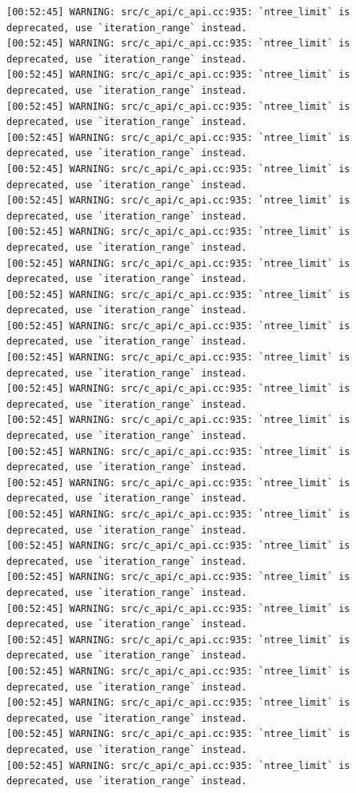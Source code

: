 \documentclass[
  letterpaper,
  DIV=11,
  numbers=noendperiod]{scrartcl}
\begin{document}
\begin{verbatim}
[00:52:45] WARNING: src/c_api/c_api.cc:935: `ntree_limit` is deprecated, use `iteration_range` instead.
[00:52:45] WARNING: src/c_api/c_api.cc:935: `ntree_limit` is deprecated, use `iteration_range` instead.
[00:52:45] WARNING: src/c_api/c_api.cc:935: `ntree_limit` is deprecated, use `iteration_range` instead.
[00:52:45] WARNING: src/c_api/c_api.cc:935: `ntree_limit` is deprecated, use `iteration_range` instead.
[00:52:45] WARNING: src/c_api/c_api.cc:935: `ntree_limit` is deprecated, use `iteration_range` instead.
[00:52:45] WARNING: src/c_api/c_api.cc:935: `ntree_limit` is deprecated, use `iteration_range` instead.
[00:52:45] WARNING: src/c_api/c_api.cc:935: `ntree_limit` is deprecated, use `iteration_range` instead.
[00:52:45] WARNING: src/c_api/c_api.cc:935: `ntree_limit` is deprecated, use `iteration_range` instead.
[00:52:45] WARNING: src/c_api/c_api.cc:935: `ntree_limit` is deprecated, use `iteration_range` instead.
[00:52:45] WARNING: src/c_api/c_api.cc:935: `ntree_limit` is deprecated, use `iteration_range` instead.
[00:52:45] WARNING: src/c_api/c_api.cc:935: `ntree_limit` is deprecated, use `iteration_range` instead.
[00:52:45] WARNING: src/c_api/c_api.cc:935: `ntree_limit` is deprecated, use `iteration_range` instead.
[00:52:45] WARNING: src/c_api/c_api.cc:935: `ntree_limit` is deprecated, use `iteration_range` instead.
[00:52:45] WARNING: src/c_api/c_api.cc:935: `ntree_limit` is deprecated, use `iteration_range` instead.
[00:52:45] WARNING: src/c_api/c_api.cc:935: `ntree_limit` is deprecated, use `iteration_range` instead.
[00:52:45] WARNING: src/c_api/c_api.cc:935: `ntree_limit` is deprecated, use `iteration_range` instead.
[00:52:45] WARNING: src/c_api/c_api.cc:935: `ntree_limit` is deprecated, use `iteration_range` instead.
[00:52:45] WARNING: src/c_api/c_api.cc:935: `ntree_limit` is deprecated, use `iteration_range` instead.
[00:52:45] WARNING: src/c_api/c_api.cc:935: `ntree_limit` is deprecated, use `iteration_range` instead.
[00:52:45] WARNING: src/c_api/c_api.cc:935: `ntree_limit` is deprecated, use `iteration_range` instead.
[00:52:45] WARNING: src/c_api/c_api.cc:935: `ntree_limit` is deprecated, use `iteration_range` instead.
[00:52:45] WARNING: src/c_api/c_api.cc:935: `ntree_limit` is deprecated, use `iteration_range` instead.
[00:52:45] WARNING: src/c_api/c_api.cc:935: `ntree_limit` is deprecated, use `iteration_range` instead.
[00:52:45] WARNING: src/c_api/c_api.cc:935: `ntree_limit` is deprecated, use `iteration_range` instead.
[00:52:45] WARNING: src/c_api/c_api.cc:935: `ntree_limit` is deprecated, use `iteration_range` instead.

\end{verbatim}
\end{document}

